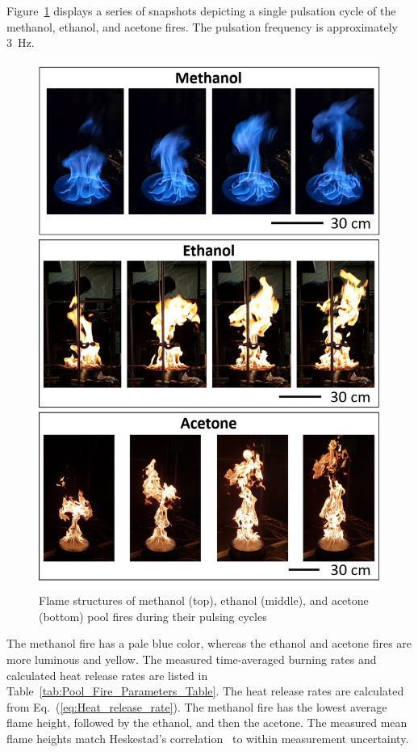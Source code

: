 \documentclass[12pt]{article}
\begin{document}
Figure~\ref{fig:Flame_Structure} displays a series of snapshots depicting a single pulsation cycle of the methanol, ethanol, and acetone fires. The pulsation frequency is approximately 3~Hz.
\begin{figure}[p]
	\centering
\includegraphics[width=5.0in,keepaspectratio]{Flame_Structure.png}
	\caption[Photographs of the three fires]{Flame structures of methanol (top), ethanol (middle), and acetone (bottom) pool fires during their pulsing cycles}
	\label{fig:Flame_Structure}
\end{figure}
The methanol fire has a pale blue color, whereas the ethanol and acetone fires are more luminous and yellow. The measured time-averaged burning rates and calculated heat release rates are listed in Table~\ref{tab:Pool_Fire_Parameters_Table}. The heat release rates are calculated from Eq.~(\ref{eq:Heat_release_rate}). The methanol fire has the lowest average flame height, followed by the ethanol, and then the acetone. The measured mean flame heights match Heskestad’s correlation~\cite{Heskestad1983} to within measurement uncertainty. 
\end{document}

